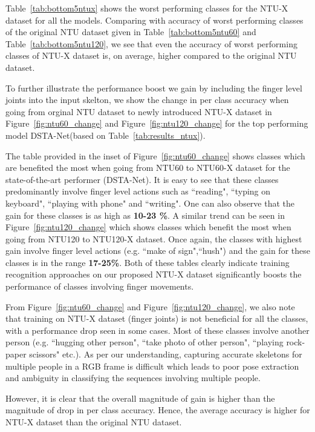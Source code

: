 \documentclass[sigconf,screen,prologue,table,dvipsnames]{acmart}
\begin{document}
Table~\ref{tab:bottom5ntux} shows the worst performing classes for the NTU-X dataset for all the models. Comparing with  accuracy of worst performing classes of the original NTU dataset given in Table~\ref{tab:bottom5ntu60} and Table~\ref{tab:bottom5ntu120}, we see that even the accuracy of worst performing classes of NTU-X dataset is, on average, higher compared to the original NTU dataset.

To further illustrate the performance boost we gain by including the finger level joints into the input skelton, we show the change in per class accuracy when going from orginal NTU dataset to newly introduced NTU-X dataset in Figure~\ref{fig:ntu60_change} and Figure~\ref{fig:ntu120_change} for the top performing model DSTA-Net\cite{dstanet_accv2020}(based on Table~\ref{tab:results_ntux}). 

The table provided in the inset of Figure~\ref{fig:ntu60_change} shows classes which are benefited the most when going from NTU60 to NTU60-X dataset for the state-of-the-art performer (DSTA-Net). It is easy to see that these classes predominantly involve finger level actions such as ``reading", ``typing on keyboard", ``playing with phone" and ``writing". One can also observe that the gain for these classes is as high as \textbf{10-23 \%}. A similar trend can be seen in Figure~\ref{fig:ntu120_change} which shows classes which benefit the most when going from NTU120 to NTU120-X dataset. Once again, the classes with highest gain involve finger level actions (e.g. ``make of sign",``hush") and the gain for these classes is in the range \textbf{17-25\%}. Both of these tables clearly indicate training recognition approaches on our proposed NTU-X dataset significantly boosts the performance of classes involving finger movements.

From Figure~\ref{fig:ntu60_change} and Figure~\ref{fig:ntu120_change}, we also note that training on NTU-X dataset (finger joints) is not beneficial for all the classes, with a performance drop seen in some cases. Most of these classes involve another person (e.g. ``hugging other person", ``take photo of other person", ``playing rock-paper scissors" etc.). As per our understanding, capturing accurate skeletons for multiple people in a RGB frame is difficult which leads to poor pose extraction and ambiguity in classifying the sequences involving multiple people.



However, it is clear that the overall magnitude of gain is higher than the magnitude of drop in per class accuracy. Hence, the average accuracy is higher for NTU-X dataset than the original NTU dataset.
\end{document}
